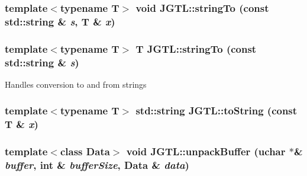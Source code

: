 \hypertarget{namespace_j_g_t_l_7c81dd2e47a577070ab612b1e8dfe8b6}{
\subsubsection[stringTo]{\setlength{\rightskip}{0pt plus 5cm}template$<$typename T$>$ void JGTL::string\-To (const std::string \& {\em s}, T \& {\em x})}}
\label{namespace_j_g_t_l_7c81dd2e47a577070ab612b1e8dfe8b6}


\hypertarget{namespace_j_g_t_l_5509bac1c7547b458b0e3119a90122e0}{
\subsubsection[stringTo]{\setlength{\rightskip}{0pt plus 5cm}template$<$typename T$>$ T JGTL::string\-To (const std::string \& {\em s})}}
\label{namespace_j_g_t_l_5509bac1c7547b458b0e3119a90122e0}


Handles conversion to and from strings \hypertarget{namespace_j_g_t_l_57b3e2e62e4a4d1b28eed30da07f644b}{
\subsubsection[toString]{\setlength{\rightskip}{0pt plus 5cm}template$<$typename T$>$ std::string JGTL::to\-String (const T \& {\em x})}}
\label{namespace_j_g_t_l_57b3e2e62e4a4d1b28eed30da07f644b}


\hypertarget{namespace_j_g_t_l_b9e062cddc8e923d7c30e2b79560eced}{
\subsubsection[unpackBuffer]{\setlength{\rightskip}{0pt plus 5cm}template$<$class Data$>$ void JGTL::unpack\-Buffer (uchar $\ast$\& {\em buffer}, int \& {\em buffer\-Size}, Data \& {\em data})}}
\label{namespace_j_g_t_l_b9e062cddc8e923d7c30e2b79560eced}


